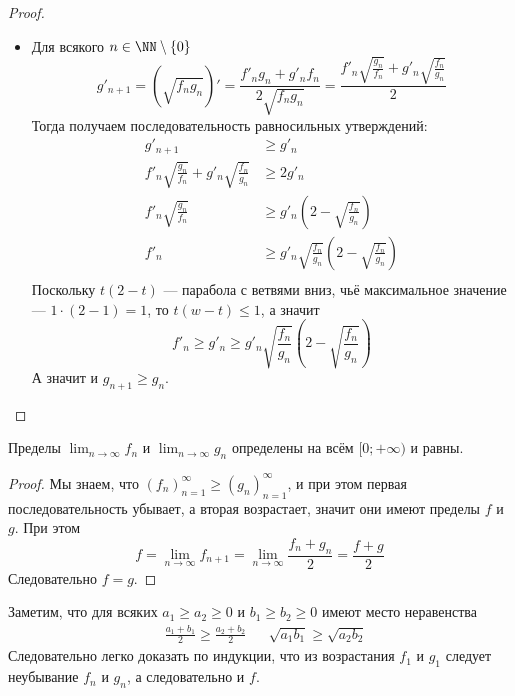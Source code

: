\documentclass[12pt,a4paper]{article}
\begin{document}
\begin{enumproblem}
\begin{proof}
\begin{itemize}
                \item Для всякого $n \in \NN \setminus \{0\}$
                    \[
                        g'_{n+1}
                        = \left(\sqrt{f_n g_n}\right)'
                        = \frac{f'_n g_n + g'_n f_n}{2 \sqrt{f_n g_n}}
                        = \frac{f'_n \sqrt{\frac{g_n}{f_n}} + g'_n \sqrt{\frac{f_n}{g_n}}}{2}
                    \]
                    Тогда получаем последовательность равносильных утверждений:
                    \begin{align*}
                        g'_{n+1} &\geqslant g'_n\\
                        f'_n \sqrt{\frac{g_n}{f_n}} + g'_n \sqrt{\frac{f_n}{g_n}} &\geqslant 2g'_n\\
                        f'_n \sqrt{\frac{g_n}{f_n}} &\geqslant g'_n (2 - \sqrt{\frac{f_n}{g_n}})\\
                        f'_n &\geqslant g'_n \sqrt{\frac{f_n}{g_n}}(2 - \sqrt{\frac{f_n}{g_n}})\\
                    \end{align*}
                    Поскольку $t(2-t)$ --- парабола с ветвями вниз, чьё максимальное значение --- $1 \cdot (2 - 1) = 1$, то $t(w - t) \leqslant 1$, а значит
                    \[f'_n \geqslant g'_n \geqslant g'_n \sqrt{\frac{f_n}{g_n}}(2 - \sqrt{\frac{f_n}{g_n}})\]
                    А значит и $g_{n+1} \geqslant g_n$.
            \end{itemize}
        \end{proof}

        \begin{lemma}
            Пределы $\lim_{n \to \infty} f_n$ и $\lim_{n \to \infty} g_n$ определены на всём $[0; +\infty)$ и равны.
        \end{lemma}

        \begin{proof}
            Мы знаем, что $(f_n)_{n=1}^\infty \geqslant (g_n)_{n=1}^\infty$, и при этом первая последовательность убывает, а вторая возрастает, значит они имеют пределы $f$ и $g$. При этом
            \[
                f
                = \lim_{n \to \infty} f_{n+1}
                = \lim_{n \to \infty} \frac{f_n + g_n}{2}
                = \frac{f + g}{2}
            \]
            Следовательно $f = g$.
        \end{proof}

        Заметим, что для всяких $a_1 \geqslant a_2 \geqslant 0$ и $b_1 \geqslant b_2 \geqslant 0$ имеют место неравенства
        \begin{align*}
            &\frac{a_1 + b_1}{2} \geqslant \frac{a_2 + b_2}{2}&
            &\sqrt{a_1 b_1} \geqslant \sqrt{a_2 b_2}
        \end{align*}
        Следовательно легко доказать по индукции, что из возрастания $f_1$ и $g_1$ следует неубывание $f_n$ и $g_n$, а следовательно и $f$.
        

\end{enumproblem}
\end{document}
